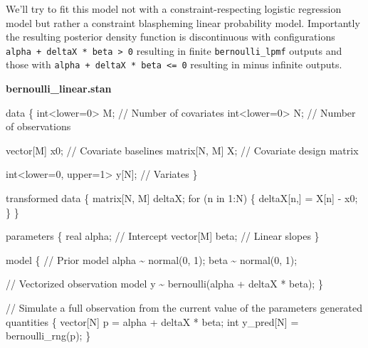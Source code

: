 \documentclass[
  letterpaper,
  DIV=11,
  numbers=noendperiod]{scrartcl}
\newenvironment{Shaded}{\begin{snugshade}}{\end{snugshade}}
\newcommand{\CommentTok}[1]{\textcolor[rgb]{0.37,0.37,0.37}{#1}}
\newcommand{\ControlFlowTok}[1]{\textcolor[rgb]{0.00,0.23,0.31}{#1}}
\newcommand{\DataTypeTok}[1]{\textcolor[rgb]{0.68,0.00,0.00}{#1}}
\newcommand{\DecValTok}[1]{\textcolor[rgb]{0.68,0.00,0.00}{#1}}
\newcommand{\KeywordTok}[1]{\textcolor[rgb]{0.00,0.23,0.31}{#1}}
\newcommand{\NormalTok}[1]{\textcolor[rgb]{0.00,0.23,0.31}{#1}}
\begin{document}
We'll try to fit this model not with a constraint-respecting logistic
regression model but rather a constraint blaspheming linear probability
model. Importantly the resulting posterior density function is
discontinuous with configurations
\texttt{alpha\ +\ deltaX\ *\ beta\ \textgreater{}\ 0} resulting in
finite \texttt{bernoulli\_lpmf} outputs and those with
\texttt{alpha\ +\ deltaX\ *\ beta\ \textless{}=\ 0} resulting in minus
infinite outputs.

\textbf{bernoulli\_linear.stan}

\begin{Shaded}
\begin{Highlighting}[]
\KeywordTok{data}\NormalTok{ \{}
  \DataTypeTok{int}\NormalTok{\textless{}}\KeywordTok{lower}\NormalTok{=}\DecValTok{0}\NormalTok{\textgreater{} M; }\CommentTok{// Number of covariates}
  \DataTypeTok{int}\NormalTok{\textless{}}\KeywordTok{lower}\NormalTok{=}\DecValTok{0}\NormalTok{\textgreater{} N; }\CommentTok{// Number of observations}
  
  \DataTypeTok{vector}\NormalTok{[M] x0;   }\CommentTok{// Covariate baselines}
  \DataTypeTok{matrix}\NormalTok{[N, M] X; }\CommentTok{// Covariate design matrix}
  
  \DataTypeTok{int}\NormalTok{\textless{}}\KeywordTok{lower}\NormalTok{=}\DecValTok{0}\NormalTok{, }\KeywordTok{upper}\NormalTok{=}\DecValTok{1}\NormalTok{\textgreater{} y[N]; }\CommentTok{// Variates}
\NormalTok{\}}

\KeywordTok{transformed data}\NormalTok{ \{}
  \DataTypeTok{matrix}\NormalTok{[N, M] deltaX;}
  \ControlFlowTok{for}\NormalTok{ (n }\ControlFlowTok{in} \DecValTok{1}\NormalTok{:N) \{}
\NormalTok{    deltaX[n,] = X[n] {-} x0\textquotesingle{};}
\NormalTok{  \}}
\NormalTok{\}}

\KeywordTok{parameters}\NormalTok{ \{}
  \DataTypeTok{real}\NormalTok{ alpha;      }\CommentTok{// Intercept}
  \DataTypeTok{vector}\NormalTok{[M] beta;  }\CommentTok{// Linear slopes}
\NormalTok{\}}

\KeywordTok{model}\NormalTok{ \{}
  \CommentTok{// Prior model}
\NormalTok{  alpha \textasciitilde{} normal(}\DecValTok{0}\NormalTok{, }\DecValTok{1}\NormalTok{);}
\NormalTok{  beta \textasciitilde{} normal(}\DecValTok{0}\NormalTok{, }\DecValTok{1}\NormalTok{);}

  \CommentTok{// Vectorized observation model}
\NormalTok{  y \textasciitilde{} bernoulli(alpha + deltaX * beta);}
\NormalTok{\}}

\CommentTok{// Simulate a full observation from the current value of the parameters}
\KeywordTok{generated quantities}\NormalTok{ \{}
  \DataTypeTok{vector}\NormalTok{[N] p = alpha + deltaX * beta;}
  \DataTypeTok{int}\NormalTok{ y\_pred[N] = bernoulli\_rng(p);}
\NormalTok{\}}
\end{Highlighting}
\end{Shaded}
\end{document}
